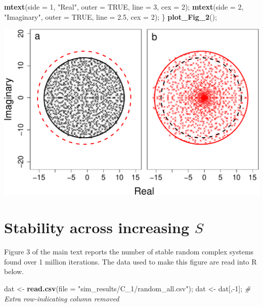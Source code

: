 \documentclass[]{article}
\newenvironment{Shaded}{\begin{snugshade}}{\end{snugshade}}
\newcommand{\KeywordTok}[1]{\textcolor[rgb]{0.13,0.29,0.53}{\textbf{{#1}}}}
\newcommand{\DataTypeTok}[1]{\textcolor[rgb]{0.13,0.29,0.53}{{#1}}}
\newcommand{\DecValTok}[1]{\textcolor[rgb]{0.00,0.00,0.81}{{#1}}}
\newcommand{\FloatTok}[1]{\textcolor[rgb]{0.00,0.00,0.81}{{#1}}}
\newcommand{\StringTok}[1]{\textcolor[rgb]{0.31,0.60,0.02}{{#1}}}
\newcommand{\CommentTok}[1]{\textcolor[rgb]{0.56,0.35,0.01}{\textit{{#1}}}}
\newcommand{\OtherTok}[1]{\textcolor[rgb]{0.56,0.35,0.01}{{#1}}}
\newcommand{\NormalTok}[1]{{#1}}
\begin{document}
\begin{Shaded}
\begin{Highlighting}[]
    \KeywordTok{mtext}\NormalTok{(}\DataTypeTok{side =} \DecValTok{1}\NormalTok{, }\StringTok{"Real"}\NormalTok{, }\DataTypeTok{outer =} \OtherTok{TRUE}\NormalTok{, }\DataTypeTok{line =} \DecValTok{3}\NormalTok{, }\DataTypeTok{cex =} \DecValTok{2}\NormalTok{);}
    \KeywordTok{mtext}\NormalTok{(}\DataTypeTok{side =} \DecValTok{2}\NormalTok{, }\StringTok{"Imaginary"}\NormalTok{, }\DataTypeTok{outer =} \OtherTok{TRUE}\NormalTok{, }\DataTypeTok{line =} \FloatTok{2.5}\NormalTok{, }\DataTypeTok{cex =} \DecValTok{2}\NormalTok{);}
\NormalTok{\}}
\KeywordTok{plot_Fig_2}\NormalTok{();}
\end{Highlighting}
\end{Shaded}

\includegraphics{unnamed-chunk-8-1.pdf}

\hypertarget{IncrS}{\section{\texorpdfstring{Stability across increasing
\(S\)}{Stability across increasing S}}\label{IncrS}}

Figure 3 of the main text reports the number of stable random complex
systems found over 1 million iterations. The data used to make this
figure are read into R below.

\begin{Shaded}
\begin{Highlighting}[]
\NormalTok{dat <-}\StringTok{ }\KeywordTok{read.csv}\NormalTok{(}\DataTypeTok{file =} \StringTok{"sim_results/C_1/random_all.csv"}\NormalTok{);}
\NormalTok{dat <-}\StringTok{ }\NormalTok{dat[,-}\DecValTok{1}\NormalTok{]; }\CommentTok{# Extra row-indicating column removed}
\end{Highlighting}
\end{Shaded}
\end{document}
